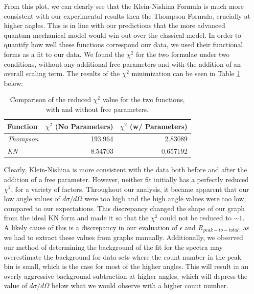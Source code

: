 \documentclass[%
 reprint,
 amsmath,amssymb,
 aps,
 pra,
]{revtex4-1}
\begin{document}
\noindent From this plot, we can clearly see that the Klein-Nishina Formula is much more consistent with our experimental results then the Thompson Formula, crucially at higher angles. This is in line with our predictions that the more advanced quantum mechanical model would win out over the classical model. In order to quantify how well these functions correspond our data, we used their functional forms as a fit to our data. We found the $\chi^2$ for the two formulae under two conditions, without any additional free parameters and with the addition of an overall scaling term. The results of the $\chi^2$ minimization can be seen in Table \ref{table:chi_square} below:

\begin{table}[htbp]
	\begin{center}
		\begin{tabular}{|l|r|r|}
			\hline
			Function & \multicolumn{1}{l|}{$\chi^2$ (No Parameters)} & \multicolumn{1}{l|}{$\chi^2$ (w/ Parameters)} \\ \hline
			\textit{Thompson} & 193.964 & 2.83089 \\ \hline
			\textit{KN} & 8.54703 & 0.657192 \\ \hline
		\end{tabular}
	\end{center}
	\caption{Comparison of the reduced $\chi^2$ value for the two functions, with and without free parameters.}
	\label{table:chi_square}
\end{table}

\noindent Clearly, Klein-Nishina is more consistent with the data both before and after the addition of a free parameter. However, neither fit initially has a perfectly reduced $\chi^2$, for a variety of factors. Throughout our analysis, it became apparent that our low angle values of $d\sigma / d\Omega$ were too high and the high angle values were too low, compared to our expectations. This discrepancy changed the shape of our graph from the ideal KN form and made it so that the $\chi^2$ could not be reduced to $\sim 1$. A likely cause of this is a discrepancy in our evaluation of $\epsilon$ and $R_{peak-to-total}$, as we had to extract these values from graphs manually. Additionally, we observed our method of determining the background of the fit for the spectra may overestimate the background for data sets where the count number in the peak bin is small, which is the case for most of the higher angles. This will result in an overly aggressive background subtraction at higher angles, which will depress the value of $d\sigma / d\Omega$ below what we would observe with a higher count number.
\end{document}
